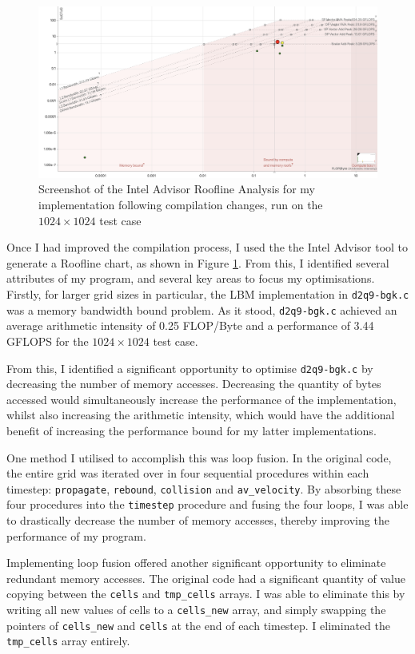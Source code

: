 \documentclass[11pt, twocolumn, a4paper]{article}
\begin{document}
\begin{figure}[htbp]
\includegraphics[width=\linewidth]{roofline_compiler.png}
\caption{Screenshot of the Intel Advisor Roofline Analysis for my implementation following compilation changes, run on the $1024\times1024$ test case}\label{fig:roofline_compiler}
\end{figure}

Once I had improved the compilation process, I used the the Intel Advisor tool to generate a Roofline chart, as shown in Figure \ref{fig:roofline_compiler}.
From this, I identified several attributes of my program, and several key areas to focus my optimisations.
Firstly, for larger grid sizes in particular, the LBM implementation in \texttt{d2q9-bgk.c} was a memory bandwidth bound problem.
As it stood, \texttt{d2q9-bgk.c} achieved an average arithmetic intensity of 0.25 FLOP/Byte and a performance of 3.44 GFLOPS for the $1024 \times 1024$ test case.

From this, I identified a significant opportunity to optimise \texttt{d2q9-bgk.c} by decreasing the number of memory accesses.
Decreasing the quantity of bytes accessed would simultaneously increase the performance of the implementation, whilst also increasing the arithmetic intensity, which would have the additional benefit of increasing the performance bound for my latter implementations.

One method I utilised to accomplish this was loop fusion.
In the original code, the entire grid was iterated over in four sequential procedures within each timestep: \texttt{propagate}, \texttt{rebound}, \texttt{collision} and \texttt{av\_velocity}.
By absorbing these four procedures into the \texttt{timestep} procedure and fusing the four loops, I was able to drastically decrease the number of memory accesses, thereby improving the performance of my program.

Implementing loop fusion offered another significant opportunity to eliminate redundant memory accesses.
The original code had a significant quantity of value copying between the \texttt{cells} and \texttt{tmp\_cells} arrays.
I was able to eliminate this by writing all new values of cells to a \texttt{cells\_new} array, and simply swapping the pointers of \texttt{cells\_new} and \texttt{cells} at the end of each timestep.
I eliminated the \texttt{tmp\_cells} array entirely.
\end{document}
